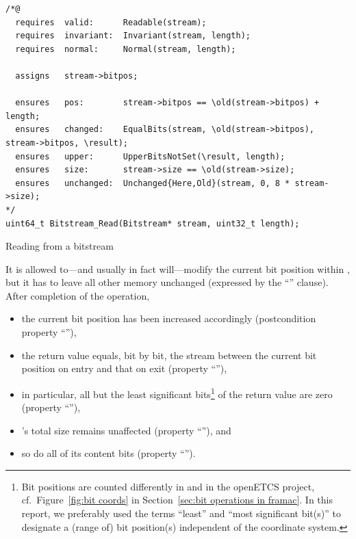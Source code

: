 \begin{listing}[hbt]
\begin{minipage}{0.99\textwidth}
\begin{lstlisting}[style=acsl-block]
/*@
  requires  valid:      Readable(stream);
  requires  invariant:  Invariant(stream, length);
  requires  normal:     Normal(stream, length);

  assigns   stream->bitpos;

  ensures   pos:        stream->bitpos == \old(stream->bitpos) + length;
  ensures   changed:    EqualBits(stream, \old(stream->bitpos), stream->bitpos, \result);
  ensures   upper:      UpperBitsNotSet(\result, length);
  ensures   size:       stream->size == \old(stream->size);
  ensures   unchanged:  Unchanged{Here,Old}(stream, 0, 8 * stream->size);
*/
uint64_t Bitstream_Read(Bitstream* stream, uint32_t length);
\end{lstlisting}
\end{minipage}
\caption{\label{lst:Bitstream_Read spec}Reading from a bitstream}
\end{listing}

\FloatBarrier

It is allowed to---and usually in fact will---modify the current bit
position within , but it has to leave all other memory
unchanged (expressed by the ``'' clause).
%
After completion of the operation, 
%
\begin{itemize}
\item the current bit position has been increased accordingly
	(postcondition property ``''),
\item the return value equals, bit by bit, the stream between the
	current bit position on entry and that on exit
	(property ``''),
\item in particular, all but the  least significant
	bits\footnote{
		Bit positions are counted differently in \framac and in
		the openETCS project, cf.\
		Figure~\ref{fig:bit coords} 
		in Section~\ref{sec:bit operations in framac}.
		In this report, we preferably used the terms ``least''
		and ``most significant bit(s)'' to
		designate a (range of) bit position(s) independent of
		the coordinate system.
	}
	of the return value are zero
	(property ``''),
\item {}'s total size remains unaffected
	(property ``''), and
\item so do all of its content bits
	(property ``'').
\end{itemize}





